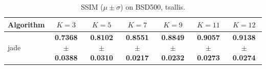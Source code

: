 \begin{table}[htbp]
\centering
\caption{SSIM ($\mu \pm \sigma$) on BSD500, tsallis.}
\label{tab:exp1-tsallis-ssim}
\begin{tabular}{lcccccc}
\toprule
Algorithm & $K=3$ & $K=5$ & $K=7$ & $K=9$ & $K=11$ & $K=12$ \\
\midrule
jade & \textbf{0.7368 $\pm$ 0.0388} & \textbf{0.8102 $\pm$ 0.0310} & \textbf{0.8551 $\pm$ 0.0217} & \textbf{0.8849 $\pm$ 0.0232} & \textbf{0.9057 $\pm$ 0.0273} & \textbf{0.9138 $\pm$ 0.0274} \\
\bottomrule
\end{tabular}
\end{table}